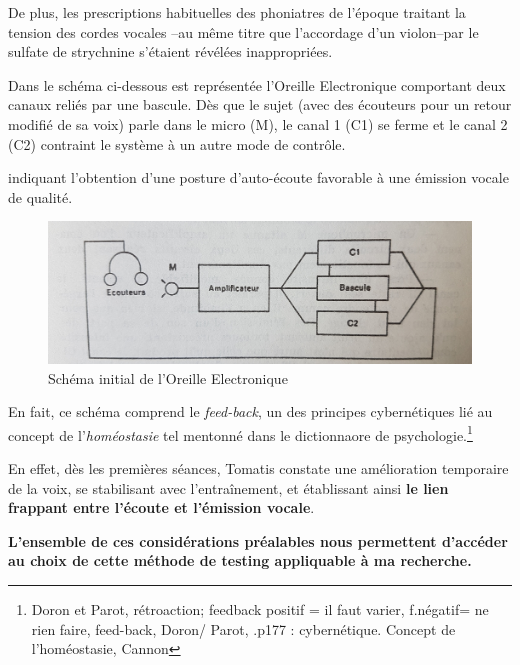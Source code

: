  De plus, les prescriptions habituelles des phoniatres de
l'époque traitant la tension des cordes vocales --au même titre que
l'accordage d'un violon--par le sulfate de
strychnine s'étaient révélées inappropriées.




Dans le schéma ci-dessous est représentée l'Oreille Electronique
comportant deux canaux reliés par une bascule. Dès que le sujet (avec
des écouteurs pour un retour modifié de sa voix) parle
dans le micro (M), le canal 1 (C1) se ferme et  le canal 2 (C2) contraint le
système à un autre mode de contrôle.

indiquant l'obtention d'une posture d'auto-écoute favorable à une
          émission vocale de qualité. \autocite[97]{tomatis_oreille_1998} 

\begin{figure}
	\centering
	\includegraphics[width=0.7\linewidth]{images/oreilleelectro.jpg}
	\caption[oreilleelectro]{Schéma initial de l'Oreille
          Electronique}
       
	\label{oreilleelectro}
\end{figure}

      
En fait, ce schéma comprend le\textit{ feed-back}, un des principes
cybernétiques lié au concept de l'\textit{homéostasie} tel
mentonné dans le dictionnaore de psychologie.\autocite[298]{doronparot}\footnote{Doron et Parot, rétroaction;
  feedback positif = il faut varier, f.négatif= ne rien faire,  feed-back, Doron/ Parot, .p177 : cybernétique. Concept de l'homéostasie, Cannon}



 En effet, dès les premières
séances, Tomatis constate une amélioration temporaire de la voix, se
stabilisant avec l'entraînement, et établissant ainsi
\textbf{le lien frappant entre l'écoute et
  l'émission vocale}.

\textbf{L'ensemble de ces considérations préalables nous permettent d'accéder au choix de
cette méthode de testing appliquable à ma recherche.}
